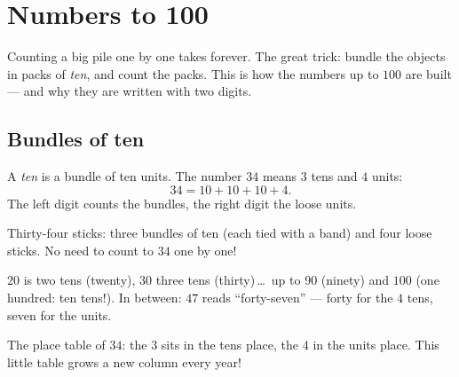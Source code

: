 \chapter{Numbers to 100}\label{ch:g1:tens}

Counting a big pile one by one takes forever. The great trick:
bundle the objects in packs of \emph{ten}, and count the packs. This
is how the numbers up to $100$ are built --- and why they are
written with two digits.

\section{Bundles of ten}

\begin{definition}\label{def:g1:tens:def}
A \emph{ten} is a bundle of ten units. The number $34$ means $3$
tens and $4$ units:
\[
34 = 10 + 10 + 10 + 4 .
\]
The left digit counts the bundles, the right digit the loose units.
\end{definition}

\begin{omfigure}

{\small Thirty-four sticks: three bundles of ten (each tied with a
band) and four loose sticks. No need to count to $34$ one by one!}
\end{omfigure}

\begin{example}\label{ex:g1:tens:reading}
$20$ is two tens (twenty), $30$ three tens (thirty)\,\dots\ up to
$90$ (ninety) and $100$ (one hundred: ten tens!). In between:
$47$ reads ``forty-seven'' --- forty for the $4$ tens, seven for the
units.
\end{example}

\begin{omfigure}

{\small The place table of $34$: the $3$ sits in the tens place, the
$4$ in the units place. This little table grows a new column every
year!}
\end{omfigure}

